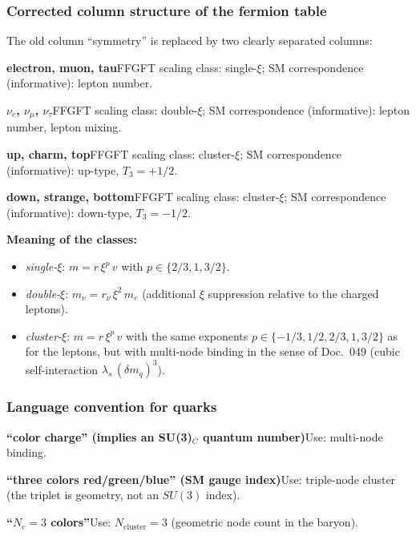 \subsubsection*{Corrected column structure of the fermion table}

The old column \enquote{symmetry} is replaced by two clearly separated columns:

\smallskip\noindent \textbf{electron, muon, tau}\quad FFGFT scaling class: single-$\xi$; SM correspondence (informative): lepton number.

\smallskip\noindent \textbf{$\nu_e$, $\nu_\mu$, $\nu_\tau$}\quad FFGFT scaling class: double-$\xi$; SM correspondence (informative): lepton number, lepton mixing.

\smallskip\noindent \textbf{up, charm, top}\quad FFGFT scaling class: cluster-$\xi$; SM correspondence (informative): up-type, $T_3 = +1/2$.

\smallskip\noindent \textbf{down, strange, bottom}\quad FFGFT scaling class: cluster-$\xi$; SM correspondence (informative): down-type, $T_3 = -1/2$.

\medskip


\textbf{Meaning of the classes:}
\begin{itemize}
  \item \emph{single-$\xi$}: $m = r\,\xi^p\,v$ with $p \in \{2/3, 1, 3/2\}$.
  \item \emph{double-$\xi$}: $m_\nu = r_\nu\,\xi^2\,m_e$
        (additional $\xi$ suppression relative to the charged leptons).
  \item \emph{cluster-$\xi$}: $m = r\,\xi^p\,v$ with the same exponents
        $p \in \{-1/3, 1/2, 2/3, 1, 3/2\}$ as for the leptons, but with
        multi-node binding in the sense of Doc.~049 (cubic self-interaction
        $\lambda_s\,(\delta m_q)^3$).
\end{itemize}

\subsubsection*{Language convention for quarks}

\smallskip\noindent \textbf{\enquote{color charge} (implies an SU(3)$_C$ quantum number)}\quad Use: multi-node binding.

\smallskip\noindent \textbf{\enquote{three colors red/green/blue} (SM gauge index)}\quad Use: triple-node cluster (the triplet is geometry, not an $SU(3)$ index).

\smallskip\noindent \textbf{\enquote{$N_c = 3$ colors}}\quad Use: $N_{\text{cluster}} = 3$ (geometric node count in the baryon).

